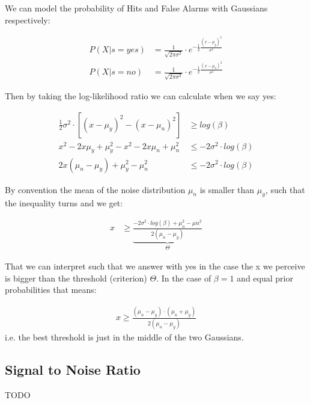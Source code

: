 We can model the probability of Hits and False Alarms with Gaussians respectively:

\begin{align*}
  P\left(X|s=yes\right) &= \frac{1}{\sqrt{2\pi \sigma^2}} \cdot e^{-\frac{1}{2}\frac{\left(x-\mu_y\right)^2}{\sigma^2}}\\
  P\left(X|s=no\right) &= \frac{1}{\sqrt{2\pi \sigma^2}} \cdot e^{-\frac{1}{2}\frac{\left(x-\mu_n\right)^2}{\sigma^2}}
\end{align*}

Then by taking the log-likelihood ratio we can calculate when we say yes:

\begin{align*}
 \frac{1}{2}\sigma^2 \cdot \left[\left(x-\mu_y\right)^2 - \left(x-\mu_n\right)^2 \right] &\geq log\left(\beta\right)\\
  x^2 - 2x\mu_y + \mu_{y}^{2} - x^2 - 2x\mu_n + \mu_{n}^{2} &\leq - 2\sigma^2 \cdot log\left(\beta\right)\\
  2x\left(\mu_n - \mu_y\right)+\mu_{y}^{2}-\mu_{n}^{2}&\leq -2\sigma^2\cdot log\left(\beta\right)\end{align*}
  
By convention the mean of the noise distribution $\mu_n$ is smaller than $\mu_y$, such that the inequality turns and we get:

\begin{align*}
  x  &\geq \underbrace{\frac{-2\sigma^2 \cdot log\left(\beta\right) + \mu_{n}^{2}-\mu{n}^{2}}{2\left(\mu_n-\mu_y\right)}}_{\Theta}
\end{align*}

That we can interpret such that we answer with yes in the case the x we perceive is bigger than the threshold (criterion) $\Theta$.
In the case of $\beta = 1$ and equal prior probabilities that means:

\begin{align*}
  x \geq \frac{\left(\mu_n-\mu_y\right)\cdot \left(\mu_n+\mu_y\right)}{2\left(\mu_n-\mu_y\right)}
\end{align*}
i.e. the best threshold is just in the middle of the two Gaussians.
\subsection{Signal to Noise Ratio}
TODO
